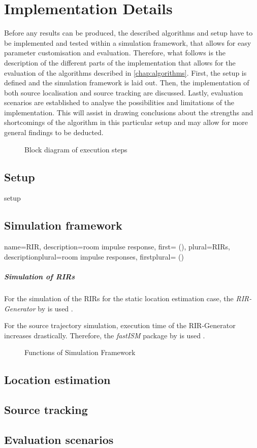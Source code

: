 \chapter{Implementation Details}
\label{chap:implementation}
Before any results can be produced, the described algorithms and setup have to be implemented and tested within a simulation framework, that allows for easy parameter customisation and evaluation. Therefore, what follows is the description of the different parts of the implementation that allows for the evaluation of the algorithms described in \ref{chap:algorithms}. First, the setup is defined and the simulation framework is laid out. Then, the implementation of both source localisation and source tracking are discussed. Lastly, evaluation scenarios are established to analyse the possibilities and limitations of the implementation. This will assist in drawing conclusions about the strengths and shortcomings of the algorithm in this particular setup and may allow for more general findings to be deducted.

\begin{figure}[H]
	\centering
	
	\caption{Block diagram of execution steps}
	\label{diag:execBlocks}
\end{figure}


\section{Setup}
\label{sec:setup}
{setup}

\section{Simulation framework}
{
  name={RIR},
  description={room impulse response},
  first={ ()},
  plural={RIRs},
  descriptionplural={room impulse responses},
  firstplural={ ()}
} 

\paragraph{Simulation of RIRs}
For the simulation of the \glspl{RIR} for the static location estimation case, the \emph{RIR-Generator} by \citeauthor{Habets2014} is used \cite{Habets2014}.

For the source trajectory simulation, execution time of the RIR-Generator increases drastically. Therefore, the \emph{fastISM} package by \citeauthor{Lehmann2010} is used \cite{Lehmann2010}.
\begin{figure}[H]
	\centering
	
	\caption{Functions of Simulation Framework}
	\label{diag:simulationFramework}
\end{figure}

%

\section{Location estimation}
\section{Source tracking}
\section{Evaluation scenarios}